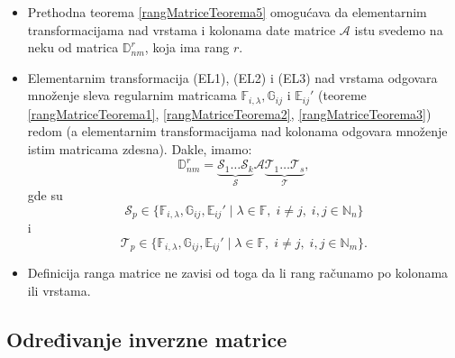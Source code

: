 \documentclass[a4paper,12pt,twoside]{report}
\numberwithin{algorithm}{section}
\begin{document}
\begin{itemize}
    \item Prethodna teorema \ref{rangMatriceTeorema5} omogućava da elementarnim transformacijama nad vrstama i kolonama date matrice $\mathcal{A}$ istu svedemo na neku od matrica $\mathbb{D}_{nm}^r$, koja ima rang $r$.
    \item Elementarnim transformacija (EL1), (EL2) i (EL3) nad vrstama odgovara množenje sleva regularnim matricama $\mathbb{F}_{i, \lambda}, \mathbb{G}_{ij}$ i $\mathbb{E}_{ij}'$ (teoreme \ref{rangMatriceTeorema1}, 
    \ref{rangMatriceTeorema2}, \ref{rangMatriceTeorema3}) redom (a elementarnim transformacijama nad kolonama odgovara množenje istim matricama zdesna).
    Dakle, imamo: 
    \[
        \mathbb{D}_{nm}^r = \underbrace{\mathcal{S}_1\dots\mathcal{S}_k}_\mathcal{S} \mathcal{A} \underbrace{\mathcal{T}_1\dots \mathcal{T}_s}_\mathcal{T},
    \]
    gde su \[\mathcal{S}_p \in \{ \mathbb{F}_{i, \lambda}, \mathbb{G}_{ij}, \mathbb{E}_{ij}' \;|\; \lambda \in \mathbb{F}, \; i \neq j, \; i,j \in \mathbb{N}_n \}\] i 
    \[\mathcal{T}_p \in \{ \mathbb{F}_{i, \lambda}, \mathbb{G}_{ij}, \mathbb{E}_{ij}' \;|\; \lambda \in \mathbb{F}, \; i \neq j, \; i,j \in \mathbb{N}_m \}.\]
    \item Definicija ranga matrice ne zavisi od toga da li rang računamo po kolonama ili vrstama.
\end{itemize}

\subsection{Određivanje inverzne matrice}
\end{document}
